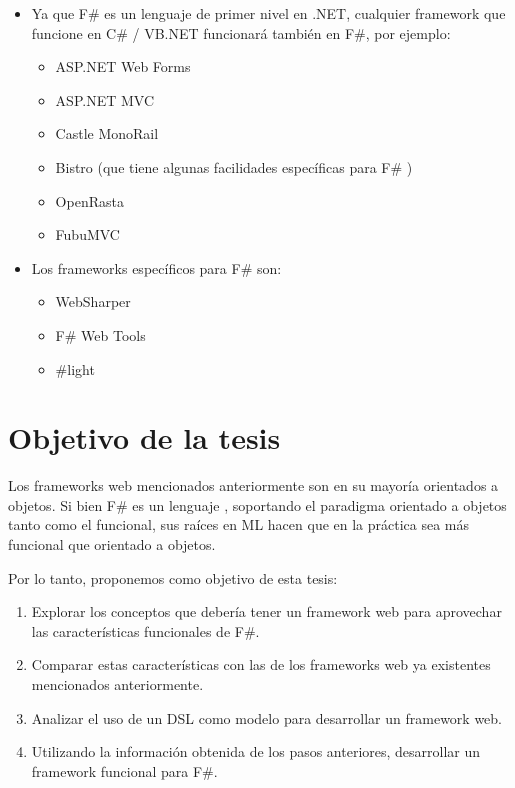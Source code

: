 \documentclass[12pt]{article}
\begin{document}
\begin{itemize}
	\item Ya que F\# es un lenguaje de primer nivel en .NET, cualquier framework que funcione en C\# / VB.NET funcionará también en F\#, por ejemplo:
	\begin{itemize}
		\item ASP.NET Web Forms \cite{webforms}
		\item ASP.NET MVC \cite{mvc}
		\item Castle MonoRail \cite{monorail}
		\item Bistro \cite{bistro} (que tiene algunas facilidades específicas para F\# \cite{bistroext})
		\item OpenRasta \cite{openrasta}
		\item FubuMVC \cite{fubumvc}
	\end{itemize}
	\item Los frameworks específicos para F\# son:
	\begin{itemize}
		\item WebSharper \cite{websharper}
		\item F\# Web Tools \cite{fswebtools}
		\item \#light \cite{sharplight}
	\end{itemize}
\end{itemize}

\section{Objetivo de la tesis}

Los frameworks web mencionados anteriormente son en su mayoría orientados a objetos. Si bien F\# es un lenguaje , soportando el paradigma orientado a objetos tanto como el funcional, sus raíces en ML hacen que en la práctica sea más funcional que orientado a objetos.

Por lo tanto, proponemos como objetivo de esta tesis:
\begin{enumerate}
	\item Explorar los conceptos que debería tener un framework web para aprovechar las características funcionales de F\#.
	\item Comparar estas características con las de los frameworks web ya existentes mencionados anteriormente.
	\item Analizar el uso de un DSL como modelo para desarrollar un framework web.
	\item Utilizando la información obtenida de los pasos anteriores, desarrollar un framework funcional para F\#. 
\end{enumerate}
\end{document}
